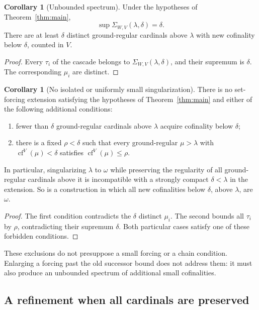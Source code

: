 \documentclass[11pt,letterpaper]{article}
\theoremstyle{definition}
\newtheorem{corollary}[definition]{Corollary}
\numberwithin{equation}{section}
\newcommand{\cf}{\operatorname{cf}}
\begin{document}
\begin{corollary}[Unbounded spectrum]\label{cor:spectrum}
Under the hypotheses of Theorem~\ref{thm:main},
\[
\sup\Sigma_{W,V}(\lambda,\delta)=\delta.
\]
There are at least $\delta$ distinct ground-regular cardinals above $\lambda$ with new cofinality below $\delta$, counted in $V$.
\end{corollary}
\begin{proof}
Every $\tau_i$ of the cascade belongs to $\Sigma_{W,V}(\lambda,\delta)$, and their supremum is $\delta$. The corresponding $\mu_i$ are distinct.
\end{proof}

\begin{corollary}[No isolated or uniformly small singularization]\label{cor:isolated}
There is no set-forcing extension satisfying the hypotheses of Theorem~\ref{thm:main} and either of the following additional conditions:
\begin{enumerate}
\item fewer than $\delta$ ground-regular cardinals above $\lambda$ acquire cofinality below $\delta$;
\item there is a fixed $\rho<\delta$ such that every ground-regular $\mu>\lambda$ with $\cf^V(\mu)<\delta$ satisfies $\cf^V(\mu)\le\rho$.
\end{enumerate}
In particular, singularizing $\lambda$ to $\omega$ while preserving the regularity of all ground-regular cardinals above it is incompatible with a strongly compact $\delta<\lambda$ in the extension. So is a construction in which all new cofinalities below $\delta$, above $\lambda$, are $\omega$.
\end{corollary}
\begin{proof}
The first condition contradicts the $\delta$ distinct $\mu_i$. The second bounds all $\tau_i$ by $\rho$, contradicting their supremum $\delta$. Both particular cases satisfy one of these forbidden conditions.
\end{proof}

These exclusions do not presuppose a small forcing or a chain condition. Enlarging a forcing past the old successor bound does not address them: it must also produce an unbounded spectrum of additional small cofinalities.

\subsection{A refinement when all cardinals are preserved}
\end{document}
